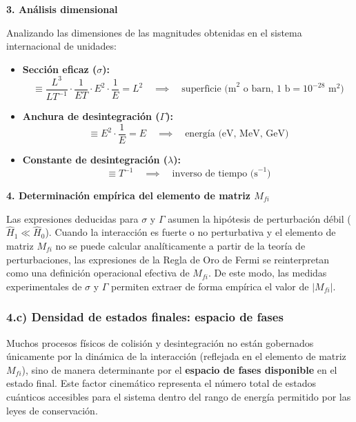 \textbf{3. Análisis dimensional}

Analizando las dimensiones de las magnitudes obtenidas en el sistema internacional de unidades:
\begin{itemize}
    \item \textbf{Sección eficaz ($\sigma$):}
    \begin{equation}
    [\sigma] \equiv \frac{L^3}{L T^{-1}} \cdot \frac{1}{E T} \cdot E^2 \cdot \frac{1}{E} = L^2 \quad \implies \quad \text{superficie (m}^2 \text{ o barn, } 1\text{ b} = 10^{-28}\text{ m}^2)
    \end{equation}

    \item \textbf{Anchura de desintegración ($\Gamma$):}
    \begin{equation}
    [\Gamma] \equiv E^2 \cdot \frac{1}{E} = E \quad \implies \quad \text{energía (eV, MeV, GeV)}
    \end{equation}

    \item \textbf{Constante de desintegración ($\lambda$):}
    \begin{equation}
    [\lambda] \equiv T^{-1} \quad \implies \quad \text{inverso de tiempo (s}^{-1})
    \end{equation}
\end{itemize}

\textbf{4. Determinación empírica del elemento de matriz $M_{fi}$}

Las expresiones deducidas para $\sigma$ y $\Gamma$ asumen la hipótesis de perturbación débil ($\hat{H}_1 \ll \hat{H}_0$). Cuando la interacción es fuerte o no perturbativa y el elemento de matriz $M_{fi}$ no se puede calcular analíticamente a partir de la teoría de perturbaciones, las expresiones de la Regla de Oro de Fermi se reinterpretan como una definición operacional efectiva de $M_{fi}$. De este modo, las medidas experimentales de $\sigma$ y $\Gamma$ permiten extraer de forma empírica el valor de $|M_{fi}|$.
\newpage
\subsubsection*{4.c) Densidad de estados finales: espacio de fases}

Muchos procesos físicos de colisión y desintegración no están gobernados únicamente por la dinámica de la interacción (reflejada en el elemento de matriz $M_{fi}$), sino de manera determinante por el \textbf{espacio de fases disponible} en el estado final. Este factor cinemático representa el número total de estados cuánticos accesibles para el sistema dentro del rango de energía permitido por las leyes de conservación.

